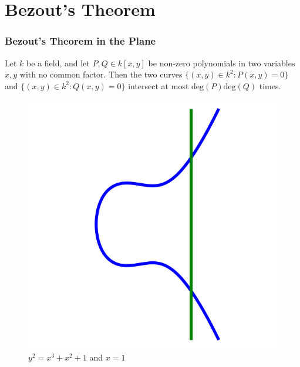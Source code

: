 \documentclass{beamer}
\begin{document}
\section{Bezout's Theorem}
\begin{frame}
\frametitle{Bezout's Theorem in the Plane}
\begin{theorem}
Let $k$ be a field, and let $P, Q \in k[x,y]$ be non-zero 
polynomials in two variables $x,y$ with no common factor.
Then the two curves 
$\{ (x,y) \in k^2 \colon P(x,y) = 0 \}$ and 
$\{ (x,y) \in k^2 \colon Q(x,y) = 0 \}$ 
intersect at most 
$\text{deg}(P) \text{deg}(Q)$ times.
\end{theorem}
\begin{figure}[H]
\includegraphics[width=.3\textwidth]{affine-intersection}
\caption{$y^2 = x^3 + x^2 + 1$ and $x=1$}
\end{figure}
\end{frame}
\end{document}
